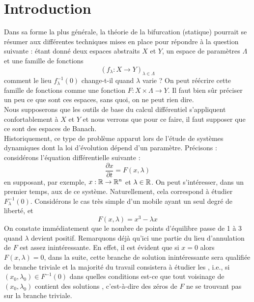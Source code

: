 \documentclass[memoire.tex]{subfiles}
\begin{document}
\section*{Introduction}
Dans sa forme la plus générale, la théorie de la bifurcation (statique) pourrait se résumer aux différentes techniques mises en place pour répondre à la question suivante : étant donné deux espaces abstraits $X$ et $Y$, un espace de paramètres $\Lambda$ et une famille de fonctions 
\begin{equation*}
    (f_{\lambda}: X\rightarrow Y)_{\lambda\in\Lambda}
\end{equation*} comment le lieu $f^{-1}_{\lambda}(0)$ change-t-il quand $\lambda$ varie ? On peut réécrire cette famille de fonctions comme une fonction 
$F: X\times\Lambda\rightarrow Y$. Il faut bien sûr préciser un peu ce que sont ces espaces, sans quoi, on ne peut rien dire.\\Nous supposerons que les outils de base du calcul différentiel s'appliquent confortablement à $X$ et $Y$ et nous verrons que pour ce faire, il faut supposer que ce sont des espaces de Banach.\\
Historiquement, ce type de problème apparut lors de l'étude de systèmes dynamiques dont la loi d'évolution dépend d'un paramètre. Précisons : 
considérons l'équation différentielle suivante :
\begin{equation}\label{equanewton}
    \frac{\partial  x}{\partial t }= F(x,\lambda)
\end{equation}
en supposant, par exemple, $x:\mathbb{R}\rightarrow \mathbb{R}^n$ et $\lambda\in\mathbb{R}$. On peut s'intéresser, dans un premier temps, aux  de ce système. Naturellement, cela correspond à étudier 
$F_{\lambda}^{-1}(0)$. Considérons le cas très simple d'un mobile ayant un seul degré de liberté, et 
\begin{equation*}
    F(x,\lambda)= x^3-\lambda x
\end{equation*}
On constate immédiatement 
que le nombre de points 
d'équilibre passe de 1 à 3 
quand $\lambda$ devient 
positif. Remarquons déjà 
qu'ici une partie du lieu 
d'annulation de $F$ est 
assez inintéressante. En 
effet, il est évident que 
si $x=0$ alors $F(x,\lambda)
=0$, dans la suite, cette 
branche de solution 
inintéressante sera 
qualifiée de branche 
triviale et la majorité du 
travail consistera à étudier 
les , i.e.,  si $(x_0,
\lambda_0)\in F^{-1}(0)$ dans quelles conditions est-ce que tout voisinage de $(x_0,\lambda_0)$ contient des solutions , c'est-à-dire des zéros  de $F$ ne se trouvant pas sur la branche triviale.\\
\end{document}

